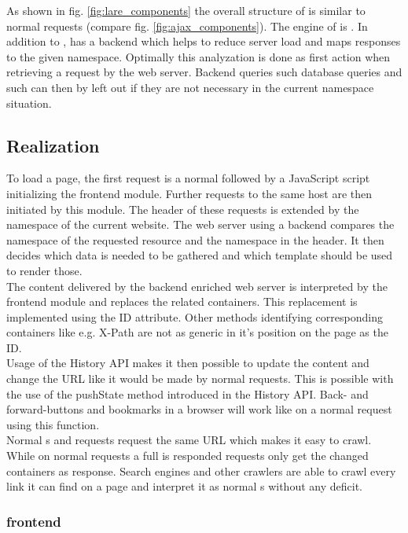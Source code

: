 \noindent{}As shown in fig. \ref{fig:lare_components} the overall structure of \lare{} is similar to normal \ajax{} requests (compare fig. \ref{fig:ajax_components}).
The \ajax{} engine of \lare{} is \lareJS{}.
In addition to \ajax{}, \lare{} has a backend which helps to reduce server load and maps responses to the given namespace.
Optimally this analyzation is done as first action when retrieving a request by the web server.
Backend queries such database queries and such can then by left out if they are not necessary in the current namespace situation.


\subsection{Realization}
To load a page, the first request is a normal \httpRequest{} followed by a JavaScript script initializing the \lare{} frontend module.
Further requests to the same host are then initiated by this module.
The \http{} header of these requests is extended by the namespace of the current website.
The web server using a \lare{} backend compares the namespace of the requested resource and the namespace in the \http{} header.
It then decides which data is needed to be gathered and which template should be used to render those.
\\
The content delivered by the \lare{} backend enriched web server is interpreted by the frontend module and replaces the related containers.
This replacement is implemented using the ID attribute.
Other methods identifying corresponding containers like e.g. X-Path are not as generic in it's position on the page as the ID.
\\
Usage of the History API makes it then possible to update the content and change the URL like it would be made by normal requests.
This is possible with the use of the pushState method introduced in the History API.
Back- and forward-buttons and bookmarks in a browser will work like on a normal request using this function.
\\
Normal \httpRequest{}s and \lare{} requests request the same URL which makes it easy to crawl.
While on normal requests a full \webPage{} is responded \lare{} requests only get the changed containers as response.
Search engines and other crawlers are able to crawl every link it can find on a page and interpret it as normal \webPage{}s without any deficit.

\subsubsection{\lare{} frontend}

